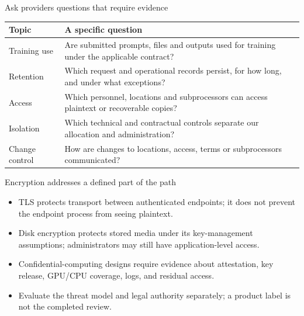 \documentclass[aspectratio=169,11pt]{beamer}
\begin{document}
\begin{frame}[t,fragile]{Ask providers questions that require evidence}
\fontsize{10.5}{12.5}\selectfont\setlength{\tabcolsep}{4pt}\renewcommand{\arraystretch}{1.15}
\begin{tabular}{>{\raggedright\arraybackslash}p{}>{\raggedright\arraybackslash}p{}}
\toprule
\textbf{Topic} & \textbf{A specific question} \\ \midrule
Training use & Are submitted prompts, files and outputs used for training under the applicable contract? \\[2pt]
Retention & Which request and operational records persist, for how long, and under what exceptions? \\[2pt]
Access & Which personnel, locations and subprocessors can access plaintext or recoverable copies? \\[2pt]
Isolation & Which technical and contractual controls separate our allocation and administration? \\[2pt]
Change control & How are changes to locations, access, terms or subprocessors communicated? \\[2pt]
\bottomrule\end{tabular}\par\vspace{2mm}
\end{frame}
\begin{frame}[t,fragile]{Encryption addresses a defined part of the path}
\fontsize{11.5}{14}\selectfont
\begin{itemize}\setlength{\itemsep}{2mm}
\item TLS protects transport between authenticated endpoints; it does not prevent the endpoint process from seeing plaintext.
\item Disk encryption protects stored media under its key-management assumptions; administrators may still have application-level access.
\item Confidential-computing designs require evidence about attestation, key release, GPU/CPU coverage, logs, and residual access.
\item Evaluate the threat model and legal authority separately; a product label is not the completed review.
\end{itemize}
\end{frame}
\end{document}
